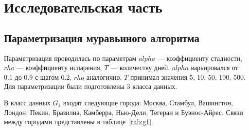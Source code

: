 \chapter{Исследовательская часть}

\section{Параметризация муравьиного алгоритма}

Параметризация проводилась по параметрам $alpha$ --- коэффициенту стадности, $rho$ --- коэффициенту испарения, $T$ --- количеству дней. $alpha$ варьировался от 0.1 до 0.9 с шагом 0.2, $rho$ аналогично, $T$ принимал значения 5, 10, 50, 100, 500. Для параметризации были подготовлены 3 класса данных.

В класс данных $G_1$ входят следующие города: Москва, Стамбул, Вашингтон, Лондон, Пекин, Бразилиа, Камберра, Нью-Дели, Тегеран и Буэнос-Айрес. Связи между городами представлены в таблице~\ref{tab:g1}.

